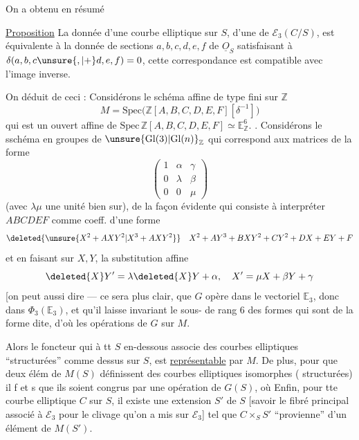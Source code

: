 On a obtenu en résumé

\uline{Proposition} La donnée d'une courbe elliptique sur $S$,   d'une   de $\mathcal E_3(C/S)$,  est équivalente à la donnée de sections $a,b,c,d,e,f$ de $\underline O_S$ satisfaisant à $\delta(a,b,c\unsure{,|+}d,e,f)=0$, cette correspondance est compatible avec l'image inverse.

On déduit de ceci : Considérons le schéma affine de type fini sur $\mathbb Z$
\[
M=\mathrm{Spec}\bigl(\mathbb Z[A,B,C,D,E,F][\delta^{-1}]\bigr)
\]
qui est un ouvert affine de $\mathrm{Spec}\,\mathbb Z[A,B,C,D,E,F]\simeq\mathbb E^6_{\mathbb Z}$. 
 . Considérons le sschéma en groupes de $\unsure{\mathrm{Gl}(3)|\mathrm{Gl}(n)}_{\mathbb Z}$ qui correspond aux matrices de la forme
\[
\begin{pmatrix}1&\alpha&\gamma\\0&\lambda&\beta\\0&0&\mu\end{pmatrix}
\]
(avec $\lambda\mu$ une unité bien sur),  de la façon évidente qui consiste à interpréter $ABCDEF$ comme coeff. d'une forme
\[
\deleted{\unsure{X^2+AXY^2|X^3+AXY^2}} \quad X^2+AY^3+BXY^2+CY^2+DX+EY+F
\]
et en faisant sur $X,Y$, la substitution affine
\[
\deleted{X}Y'=\lambda\deleted{X}Y+\alpha,\quad X'=\mu X+\beta Y+\gamma
\]
[on peut aussi dire --- ce sera plus clair, que $G$ opère dans le vectoriel $\mathbb E_3$, donc dans $\Phi_3(\mathbb E_3)$, et qu'il laisse invariant le sous- de  rang 6 des formes qui sont de la forme dite, d'où les opérations de $G$ sur $M$.


Alors le foncteur qui à tt $S$ en-dessous associe  des courbes elliptiques ``structurées'' comme dessus sur $S$, est \uline{représentable} par $M$. De plus, pour que deux élém de
$M(S)$ définissent des courbes elliptiques isomorphes ( structurées) il f et s que  ils soient congrus par une opération de $G(S)$, où  Enfin, pour tte courbe elliptique $C$ sur $S$, il existe une extension   $S'$ de $S$ [savoir le fibré principal associé à $\mathcal E_3$ pour le clivage qu'on a mis sur $\mathcal E_3$] tel que  $C\times_S S'$ ``provienne'' d'un élément de $M(S')$.

